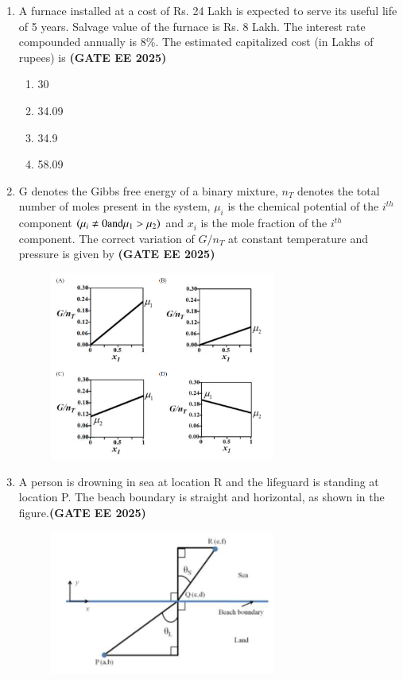 \documentclass[journal,12pt,onecolumn]{IEEEtran}
\theoremstyle{remark}
\begin{document}
\begin{enumerate}
\item A furnace installed at a cost of Rs. 24 Lakh is expected to serve its useful life of 5 years. Salvage value of the furnace is Rs. 8 Lakh. The interest rate compounded annually is 8\%. The estimated capitalized cost (in Lakhs of rupees) is
\hfill \textbf{(GATE EE 2025)} \begin{enumerate}
    \item 30
    \item 34.09
    \item 34.9
    \item 58.09
\end{enumerate}


\item G denotes the Gibbs free energy of a binary mixture, $n_T$ denotes the total number of moles present in the system, $\mu_{i}$ is the chemical potential of the $i^{th}$ component $\left(\mu_{i}\ne0 \text{and} \mu_{1}>\mu_{2}\right)$ and $x_i$ is the mole fraction of the $i^{th}$ component. The correct variation of $G/n_{T}$  at constant temperature and pressure is given by \hfill \textbf{(GATE EE 2025)}
	\begin{figure}
\begin{center}
	\includegraphics[width=0.7\textwidth]{figs/29.png}
         \caption{}
\end{center}
	\end{figure}
\item A person is drowning in sea at location R and the lifeguard is standing at location P. The beach boundary is straight and horizontal, as shown in the figure.\hfill \textbf{(GATE EE 2025)}
	\begin{figure}
\begin{center} 
\includegraphics[width=0.7\textwidth]{figs/30.png}

\end{center}
\end{figure}
\end{enumerate}
\end{document}
